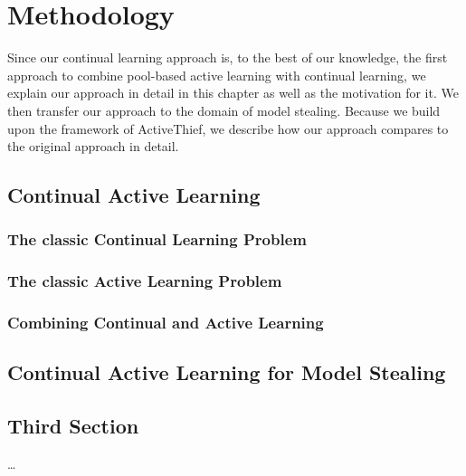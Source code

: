 
\chapter{Methodology}
\label{ch:Methodolody}

Since our continual learning approach is, to the best of our knowledge, the first approach to combine pool-based active learning with continual
learning, we explain our approach in detail in this chapter as well as the motivation for it. We then transfer our approach to the domain of model
stealing. Because we build upon the framework of ActiveThief, we describe how our approach compares to the original approach in detail.

\section{Continual Active Learning}
\label{sec:Methodology:ContinualActiveLearning}

\subsection{The classic Continual Learning Problem}
\label{sec:Methodology:CLProblem}

\subsection{The classic Active Learning Problem}
\label{sec:Methodology:ALProblem}

\subsection{Combining Continual and Active Learning}

\section{Continual Active Learning for Model Stealing}
\label{sec:Analysis:SecondSection}


\section{Third Section}
\label{sec:Analysis:ThirdSection}

\dots
